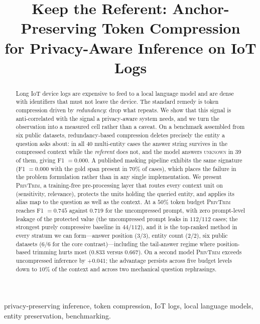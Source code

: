 \documentclass[conference]{IEEEtran}
\newcommand{\ours}{\textsc{PrivTrim}}
\begin{document}
\title{Keep the Referent: Anchor-Preserving Token Compression\\ for Privacy-Aware Inference on IoT Logs}

\author{
}

\maketitle

\begin{abstract}
Long IoT device logs are expensive to feed to a local language model and are dense with
identifiers that must not leave the device. The standard remedy is token compression driven by
\emph{redundancy}: drop what repeats. We show that this signal is anti-correlated with the
signal a privacy-aware system needs, and we turn the observation into a measured cell rather
than a caveat. On a benchmark assembled from six public datasets, redundancy-based compression
deletes precisely the entity a question asks about: in all 40 multi-entity cases the answer
string survives in the compressed context while the \emph{referent} does not, and the model
answers \textsc{unknown} in 39 of them, giving F1 $=0.000$. A published masking pipeline
exhibits the same signature (F1 $=0.000$ with the gold span present in $70\%$ of cases), which
places the failure in the problem formulation rather than in any single implementation. We
present \ours{}, a training-free pre-processing layer that routes every context unit on
(sensitivity, relevance), protects the units holding the queried entity, and applies its alias
map to the question as well as the context. At a $50\%$ token budget \ours{} reaches F1
$=0.745$ against $0.719$ for the uncompressed prompt, with zero prompt-level leakage of the
protected value (the uncompressed prompt leaks in $112/112$ cases; the strongest purely
compressive baseline in $44/112$), and it is the top-ranked method in every stratum we can
form---answer position (3/3), entity count (2/2), six public datasets (6/6 for the core
contrast)---including the tail-answer regime where position-based trimming hurts most
($0.833$ versus $0.667$). On a second model \ours{} exceeds uncompressed inference by
$+0.041$; the advantage persists across five budget levels down to $10\%$ of the context and
across two mechanical question rephrasings.
\end{abstract}

\begin{IEEEkeywords}
privacy-preserving inference, token compression, IoT logs, local language models,
entity preservation, benchmarking.
\end{IEEEkeywords}
\end{document}
